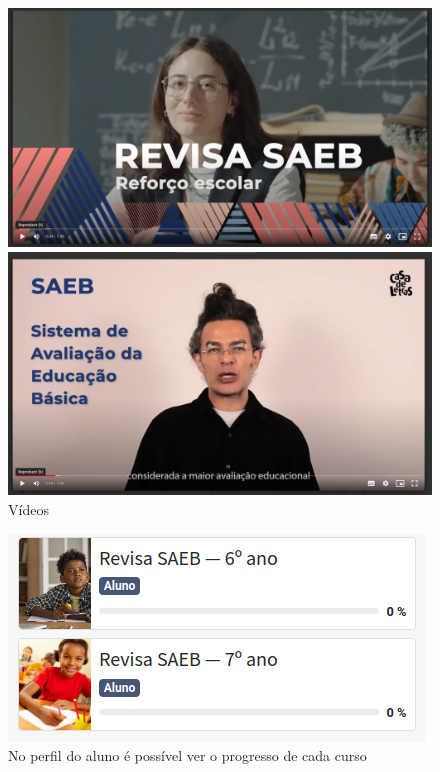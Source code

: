 \begin{figure}[H]
\includegraphics[width=\textwidth]{imgs/video1}\bigskip

\includegraphics[width=\textwidth]{imgs/video-2}
\caption{Vídeos}
\end{figure}



\begin{figure}[H]
\includegraphics[width=\textwidth]{imgs/progresso}
\caption{No perfil do aluno é possível ver o progresso de cada curso}
\end{figure}


